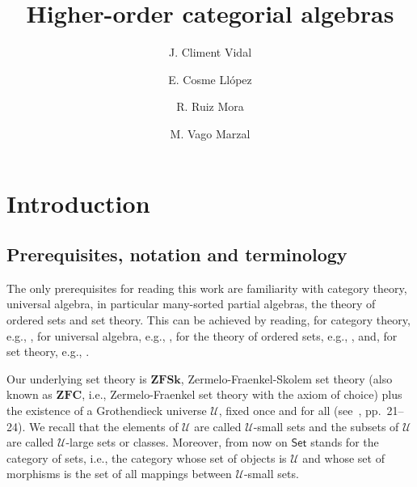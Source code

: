 \documentclass{amsart}
\theoremstyle{plain}
\theoremstyle{definition}
\begin{document}
\title{Higher-order categorial algebras}

\author[Climent]{J. Climent Vidal}
\address{Universitat de Val\`{e}ncia\\
         Departament de L\`{o}gica i Filosofia de la Ci\`{e}ncia
         }

\author[Cosme]{E. Cosme Ll\'{o}pez}
\address{Universitat de Val\`{e}ncia\\
         Departament de Matem\`{a}tiques\\ and 
         Nantong University\\ %
         School of Mathematics and Statistics
         }

\author[Ruiz]{R. Ruiz Mora}
\address{Universitat de Val\`{e}ncia\\
         Departament de Matem\`{a}tiques
         }

\author[Vago]{M. Vago Marzal}

\maketitle

\section{Introduction}\label{SIntroduction}

\subsection{Prerequisites, notation and terminology}

The only prerequisites for reading this work are familiarity with category theory, universal algebra, in particular many-sorted partial algebras, the theory of ordered sets and set theory. This can be achieved by reading, for category theory, e.g., \cite{hs73,sM98}, for universal algebra, e.g., \cite{gb15,pb82,pb86,pb02,bs81,gtw85,gG08,agk67,sch66,sch70,w92}, for the theory of ordered sets, e.g., \cite{bl05,DP02,R08}, and, for set theory, e.g., \cite{nB70,end77}.

Our underlying set theory is $\mathbf{ZFSk}$, Zermelo-Fraenkel-Skolem set theory (also known as $\mathbf{ZFC}$, i.e.,  Zermelo-Fraenkel set theory with the axiom of choice) plus the existence of a Grothendieck universe $\boldsymbol{\mathcal{U}}$, fixed once and for all (see~\cite{sM98}, pp.~21--24). We recall that the elements of $\boldsymbol{\mathcal{U}}$ are called $\boldsymbol{\mathcal{U}}$-small sets and the subsets of $\boldsymbol{\mathcal{U}}$ are called $\boldsymbol{\mathcal{U}}$-large sets or classes. Moreover, from now on $\mathsf{Set}$ stands for the category of sets, i.e., the category whose set of objects is $\boldsymbol{\mathcal{U}}$ and whose set of morphisms is the set of all mappings between $\boldsymbol{\mathcal{U}}$-small sets.
\end{document}
